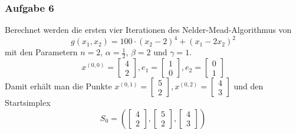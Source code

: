 \documentclass[a4paper, 12pt]{report}
\begin{document}
\subsubsection{Aufgabe 6}
Berechnet werden die ersten vier Iterationen des Nelder-Mead-Algorithmus von
$$g(x_1, x_2) = 100\cdot(x_2-2)^4 + (x_1 - 2x_2)^2$$
mit den Parametern $n=2$, $\alpha = \frac{1}{2}$, $\beta = 2$ und $\gamma = 1$.
$$x^{(0,0)} = \begin{bmatrix}4\\2\end{bmatrix}, e_1 = \begin{bmatrix}1\\0\end{bmatrix}, e_2 = \begin{bmatrix}0\\1\end{bmatrix}$$
Damit erhält man die Punkte $x^{(0,1)} = \begin{bmatrix}5\\2\end{bmatrix}, x^{(0,2)} = \begin{bmatrix}4\\3\end{bmatrix}$ und den
Startsimplex
$$S_0 = (\begin{bmatrix}4\\2\end{bmatrix}, \begin{bmatrix}5\\2\end{bmatrix}, \begin{bmatrix}4\\3\end{bmatrix})$$
\end{document}
